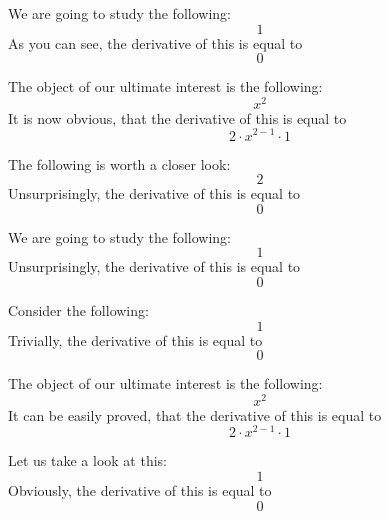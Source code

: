 \documentclass{article}
\begin{document}
We are going to study the following:
\begin{equation}
1 
\end{equation}
As you can see, the derivative of this is equal to
\begin{equation}
0 
\end{equation}

The object of our ultimate interest is the following:
\begin{equation}
x ^{2 } 
\end{equation}
It is now obvious, that the derivative of this is equal to
\begin{equation}
2 \cdot x ^{2 - 1 } \cdot 1 
\end{equation}

The following is worth a closer look:
\begin{equation}
2 
\end{equation}
Unsurprisingly, the derivative of this is equal to
\begin{equation}
0 
\end{equation}

We are going to study the following:
\begin{equation}
1 
\end{equation}
Unsurprisingly, the derivative of this is equal to
\begin{equation}
0 
\end{equation}

Consider the following:
\begin{equation}
1 
\end{equation}
Trivially, the derivative of this is equal to
\begin{equation}
0 
\end{equation}

The object of our ultimate interest is the following:
\begin{equation}
x ^{2 } 
\end{equation}
It can be easily proved, that the derivative of this is equal to
\begin{equation}
2 \cdot x ^{2 - 1 } \cdot 1 
\end{equation}

Let us take a look at this:
\begin{equation}
1 
\end{equation}
Obviously, the derivative of this is equal to
\begin{equation}
0 
\end{equation}
\end{document}
